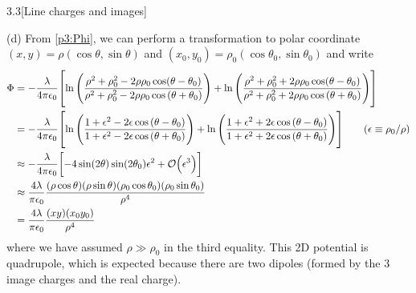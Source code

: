 \documentclass[12pt]{article}
\begin{document}
\begin{problem}{3.3}[Line charges and images]
\begin{solution}
    (d) From \eqref{p3:Phi}, we can perform a transformation to polar coordinate
    $(x,y)=\rho(\cos\theta,\sin\theta)$ and
    $(x_0,y_0)=\rho_0(\cos\theta_0,\sin\theta_0)$ and write
    \begin{align}
        \Phi&=-\frac{\lambda}{4\pi\epsilon_0}\qty[
        \ln\qty(\frac{\rho^2+\rho_0^2-2\rho\rho_0\cos(\theta-\theta_0)}{\rho^2+\rho_0^2-2\rho\rho_0\cos\qty(\theta+\theta_0)})
        +\ln\qty(\frac{\rho^2+\rho_0^2+2\rho\rho_0\cos(\theta-\theta_0)}{\rho^2+\rho_0^2+2\rho\rho_0\cos\qty(\theta+\theta_0)})
        ]\notag\\
            &=-\frac{\lambda}{4\pi\epsilon_0}\qty[
            \ln\qty(\frac{1+\epsilon^2-2\epsilon\cos\qty(\theta-\theta_0)}{1+\epsilon^2-2\epsilon\cos\qty(\theta+\theta_0)})
            +\ln\qty(\frac{1+\epsilon^2+2\epsilon\cos\qty(\theta-\theta_0)}{1+\epsilon^2+2\epsilon\cos\qty(\theta+\theta_0)})
            ]\tag{$\epsilon\equiv\rho_0/\rho$}\\
            &\approx-\frac{\lambda}{4\pi\epsilon_0}\qty[-4\sin(2\theta)\sin(2\theta_0)\epsilon^2+\order{\epsilon^3}]\notag\\
            &\approx\frac{4\lambda}{\pi\epsilon_0}\frac{(\rho\cos\theta)(\rho\sin\theta)(\rho_0\cos\theta_0)(\rho_0\sin\theta_0)}{\rho^4}\notag\\
            &=\frac{4\lambda}{\pi\epsilon_0}\frac{(xy)(x_0y_0)}{\rho^4}
    \end{align}
    where we have assumed $\rho\gg\rho_0$ in the third equality. This
    2D potential
    is quadrupole, which is expected because there are two dipoles (formed by
    the 3 image charges and the real charge).
\end{solution}
\end{problem}
\end{document}
